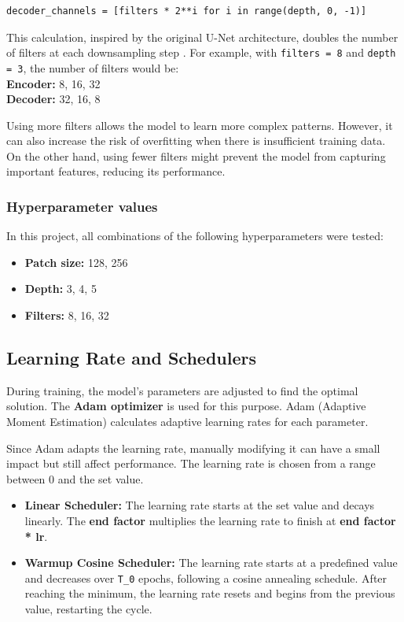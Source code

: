 \begin{verbatim}
decoder_channels = [filters * 2**i for i in range(depth, 0, -1)]
\end{verbatim}

This calculation, inspired by the original U-Net architecture, doubles the number of filters at each downsampling step \cite{2018arXiv180906839B}. For example, with \texttt{filters = 8} and \texttt{depth = 3}, the number of filters would be:  
\\\textbf{Encoder:} 8, 16, 32 \\
\textbf{Decoder:} 32, 16, 8

Using more filters allows the model to learn more complex patterns. However, it can also increase the risk of overfitting when there is insufficient training data. On the other hand, using fewer filters might prevent the model from capturing important features, reducing its performance.
\subsubsection{Hyperparameter values}\label{sec:1.2.8}

In this project, all combinations of the following hyperparameters were tested:

\begin{itemize}
    \item \textbf{Patch size:} 128, 256
    \item \textbf{Depth:} 3, 4, 5
    \item \textbf{Filters:} 8, 16, 32
\end{itemize}

\subsection{Learning Rate and Schedulers}\label{sec:1.2.9}

During training, the model's parameters are adjusted to find the optimal solution. The \textbf{Adam optimizer} \cite{kingma2017adammethodstochasticoptimization} is used for this purpose. Adam (Adaptive Moment Estimation) calculates adaptive learning rates for each parameter.

Since Adam adapts the learning rate, manually modifying it can have a small impact but still affect performance. The learning rate is chosen from a range between 0 and the set value.

\begin{itemize}
    \item \textbf{Linear Scheduler:} The learning rate starts at the set value and decays linearly. The \textbf{end factor} multiplies the learning rate to finish at \textbf{end factor * lr}.
    \item \textbf{Warmup Cosine Scheduler:} The learning rate starts at a predefined value and decreases over \texttt{T\_0} epochs, following a cosine annealing schedule. After reaching the minimum, the learning rate resets and begins from the previous value, restarting the cycle.
\end{itemize}


